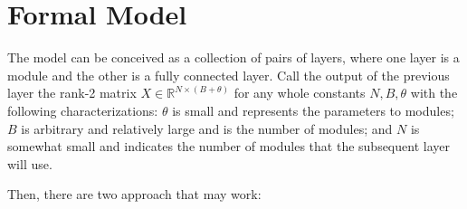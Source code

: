 \documentclass[12pt]{article}
\begin{document}
\begin{comment}
\paragraph{Outline}
The remainder of this article is organized as follows.
Section~\ref{Model} outlines the architecture of the model.
Our new and exciting results are described in Section~\ref{results}.
Finally, Section~\ref{conclusions} gives the conclusions.
\end{comment}

\section{Formal Model}\label{Formal Model}
\par The model can be conceived as a collection of pairs of layers, where one layer is a module and the other is a fully connected layer.  Call the output of the previous layer the rank-2 matrix $X \in \mathbb{R}^{N\times(B+\theta)}$ for any whole constants $N, B, \theta$ with the following characterizations:  $\theta$ is small and represents the parameters to modules; $B$ is arbitrary and relatively large and is the number of modules; and $N$ is somewhat small and indicates the number of modules that the subsequent layer will use. \par 
Then, there are two approach that may work:
\end{document}
